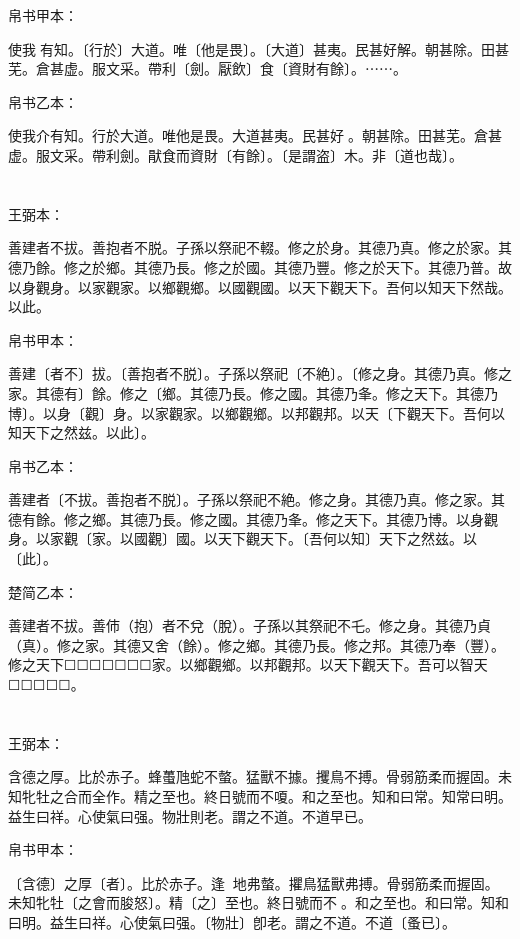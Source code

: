\documentclass[a5paper]{ctexbook}
\begin{document}
    
    帛书甲本：

    使我𢴲有知。〔行於〕大道。唯〔他是畏〕。〔大道〕甚夷。民甚好解。朝甚除。田甚芜。倉甚虚。服文采。帶利〔劍。厭飲〕食〔資財有餘〕。⋯⋯。

    帛书乙本：

    使我介有知。行於大道。唯他是畏。大道甚夷。民甚好𠎿。朝甚除。田甚芜。倉甚虚。服文采。帶利劍。猒食而資財〔有餘〕。〔是謂盗〕木。非〔道也哉〕。

    \chapter{}
    王弼本：

    善建者不拔。善抱者不脱。子孫以祭祀不輟。修之於身。其德乃真。修之於家。其德乃餘。修之於鄉。其德乃長。修之於國。其德乃豐。修之於天下。其德乃普。故以身觀身。以家觀家。以鄉觀鄉。以國觀國。以天下觀天下。吾何以知天下然哉。以此。

    
    帛书甲本：

    善建〔者不〕拔。〔善抱者不脱〕。子孫以祭祀〔不絶〕。〔修之身。其德乃真。修之家。其德有〕餘。修之〔鄉。其德乃長。修之國。其德乃夆。修之天下。其德乃博〕。以身〔觀〕身。以家觀家。以鄉觀鄉。以邦觀邦。以天〔下觀天下。吾何以知天下之然兹。以此〕。

    帛书乙本：

    善建者〔不拔。善抱者不脱〕。子孫以祭祀不絶。修之身。其德乃真。修之家。其德有餘。修之鄉。其德乃長。修之國。其德乃夆。修之天下。其德乃博。以身觀身。以家觀〔家。以國觀〕國。以天下觀天下。〔吾何以知〕天下之然兹。以〔此〕。

    楚简乙本：

    善建者不拔。善伂（抱）者不兌（脫）。子孫以其祭祀不乇。修之身。其德乃貞（真）。修之家。其德又舍（餘）。修之鄉。其德乃長。修之邦。其德乃奉（豐）。修之天下☐☐☐☐☐☐☐家。以鄉觀鄉。以邦觀邦。以天下觀天下。吾可以智天☐☐☐☐☐。

    \chapter{}
    王弼本：

    含德之厚。比於赤子。蜂蠆虺蛇不螫。猛獸不據。攫鳥不搏。骨弱筋柔而握固。未知牝牡之合而全作。精之至也。終日號而不嗄。和之至也。知和曰常。知常曰明。益生曰祥。心使氣曰强。物壯則老。謂之不道。不道早已。

    
    帛书甲本：

    〔含德〕之厚〔者〕。比於赤子。逢𢔯𧍥地弗螫。㩴鳥猛獸弗搏。骨弱筋柔而握固。未知牝牡〔之會而朘怒〕。精〔之〕至也。終日號而不𢖻。和之至也。和曰常。知和曰明。益生曰祥。心使氣曰强。〔物壯〕卽老。謂之不道。不道〔蚤已〕。
\end{document}

